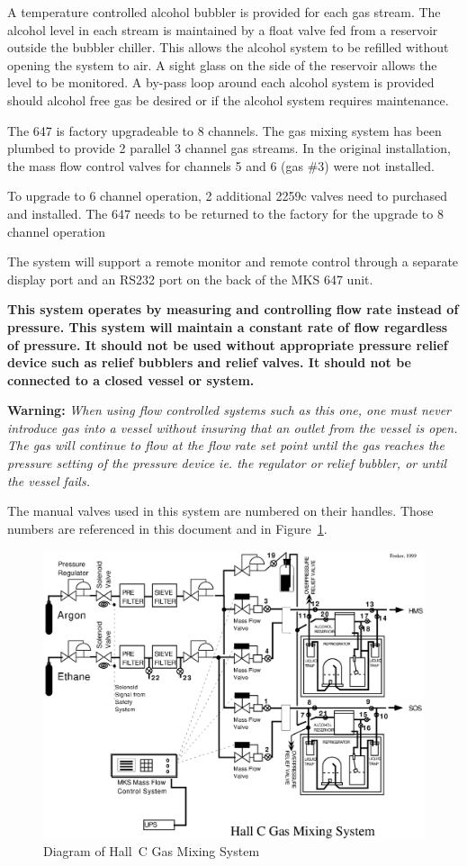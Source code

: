 A temperature controlled alcohol bubbler is provided for each gas
stream.  The alcohol level in each stream is maintained by a float valve
fed from a reservoir outside the bubbler chiller. This allows the alcohol
system to be refilled without opening the system to air.  A sight glass on
the side of the reservoir allows the level to be monitored.  A by-pass loop
around each alcohol system is provided should alcohol free gas be desired
or if the alcohol system requires maintenance.

The 647 is factory upgradeable to 8 channels.  The gas mixing
system has been plumbed to provide 2 parallel 3 channel gas streams.  In
the original installation, the mass flow control valves for channels 5 and
6 (gas \#3) were not installed.

To upgrade to 6 channel operation, 2 additional 2259c valves need
to purchased and installed.  The 647 needs to be returned to the factory
for the upgrade to 8 channel operation

The system will support a remote monitor and remote control through
a separate display port and an RS232 port on the back of the MKS 647 unit.

{\bf This system operates by measuring and controlling flow rate instead
of pressure. This system will maintain a constant rate of flow
regardless of pressure. It should not be used without appropriate pressure
relief device such as relief bubblers and relief valves. It should not be
connected to a closed vessel or system.}

{\bf Warning:} {\em{When using flow controlled systems such as this one, one 
must never introduce gas into a vessel without insuring that an outlet from the vessel is 
open.  The gas will continue to flow at the flow rate set point until the gas 
reaches the pressure setting of the pressure device ie. the regulator or relief 
bubbler, or until the vessel fails}.}

The manual valves used in this system are numbered on their
handles.  Those numbers are referenced in this document and in
Figure~\ref{fig:gas_mix}.
\begin{figure}
\includegraphics[width=6in,bb=12 12 750 590]{detectors/HallCGasMixlvl1.eps}
\caption{Diagram of Hall~C Gas Mixing System\label{fig:gas_mix}}
\end{figure}

